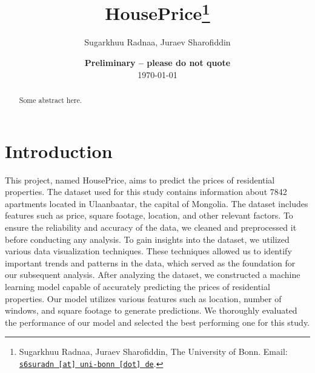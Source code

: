 \documentclass[11pt, a4paper, leqno]{article}
\begin{document}
\title{HousePrice\thanks{Sugarkhuu Radnaa, Juraev Sharofiddin, The University of Bonn. Email: \href{mailto:s6suradn@uni-bonn.de}{\nolinkurl{s6suradn [at] uni-bonn [dot] de}}.}}

\author{Sugarkhuu Radnaa, Juraev Sharofiddin}

\date{
    {\bf Preliminary -- please do not quote}
    \\[1ex]
    \today
}

\maketitle


\begin{abstract}
    Some abstract here.
\end{abstract}

\clearpage


\section{Introduction} %
\label{sec:introduction}

This project, named HousePrice, aims to predict the prices of residential properties.
The dataset used for this study contains information about 7842 apartments located in Ulaanbaatar, the capital of Mongolia.
The dataset includes features such as price, square footage, location, and other relevant factors.
To ensure the reliability and accuracy of the data, we cleaned and preprocessed it before conducting any analysis.
To gain insights into the dataset, we utilized various data visualization techniques.
These techniques allowed us to identify important trends and patterns in the data, which served as the foundation for our subsequent analysis.
After analyzing the dataset, we constructed a machine learning model capable of accurately predicting the prices of residential properties.
Our model utilizes various features such as location, number of windows, and square footage to generate predictions.
We thoroughly evaluated the performance of our model and selected the best performing one for this study.





\end{document}
